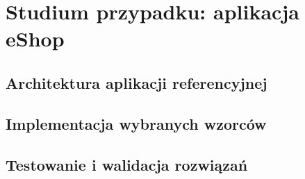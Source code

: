 \cleardoublepage

\chapter{Studium przypadku: aplikacja eShop}
\label{cha:StudiumPrzypadku}

\section{Architektura aplikacji referencyjnej}
\label{sec:ArchitekturaReferencyjna}

\section{Implementacja wybranych wzorców}
\label{sec:ImplementacjaWzorcow}

\section{Testowanie i walidacja rozwiązań}
\label{sec:TestowanieWalidacja}
